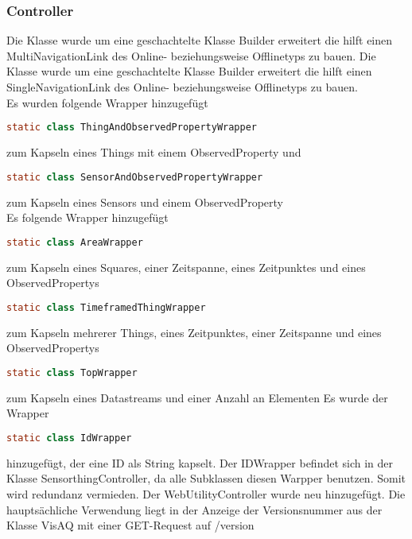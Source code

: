 \subsubsection{Controller}
\noChange
{}
Die Klasse wurde um eine geschachtelte Klasse Builder erweitert die hilft einen MultiNavigationLink des Online- beziehungsweise Offlinetyps zu bauen.
\noChange
{}
\noChange
{}
\noChange
{}
Die Klasse wurde um eine geschachtelte Klasse Builder erweitert die hilft einen SingleNavigationLink des Online- beziehungsweise Offlinetyps zu bauen.
\noChange
\controllerWrapper
\\
Es wurden folgende Wrapper hinzugefügt
\begin{lstlisting}[language=java]
    static class ThingAndObservedPropertyWrapper
\end{lstlisting}
zum Kapseln eines Things mit einem ObservedProperty
und 
\begin{lstlisting}[language=java]
    static class SensorAndObservedPropertyWrapper
\end{lstlisting}
zum Kapseln eines Sensors und einem ObservedProperty
\controllerWrapper
{}
\controllerWrapper
{}
\controllerWrapper
{}
\controllerWrapper
\\
Es folgende Wrapper hinzugefügt
\begin{lstlisting}[language=java]
    static class AreaWrapper
\end{lstlisting}
zum Kapseln eines Squares, einer Zeitspanne, eines Zeitpunktes und eines ObservedPropertys
\begin{lstlisting}[language=java]
    static class TimeframedThingWrapper
\end{lstlisting}
zum Kapseln mehrerer Things, eines Zeitpunktes, einer Zeitspanne und eines ObservedPropertys
\begin{lstlisting}[language=java]
    static class TopWrapper
\end{lstlisting}
zum Kapseln eines Datastreams und einer Anzahl an Elementen
\controllerWrapper
{}
\controllerWrapper
{}
Es wurde der Wrapper
\begin{lstlisting}[language=java]
    static class IdWrapper
\end{lstlisting}
hinzugefügt, der eine ID als String kapselt.
Der IDWrapper befindet sich in der Klasse SensorthingController, da alle Subklassen diesen Warpper benutzen.
Somit wird redundanz vermieden.
\controllerWrapper
{}
\controllerWrapper
{}
Der WebUtilityController wurde neu hinzugefügt. Die hauptsächliche Verwendung liegt in der Anzeige der Versionsnummer aus der Klasse VisAQ mit einer GET-Request auf /version

